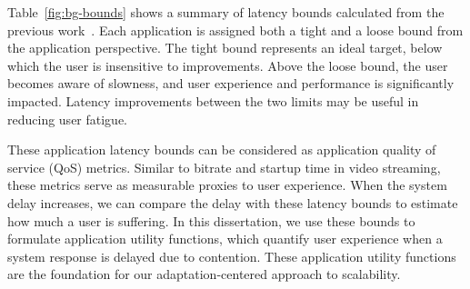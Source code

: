 Table~\ref{fig:bg-bounds} shows a summary of latency bounds calculated from the
previous work~\cite{chen2017empirical}. Each application is assigned both a
tight and a loose bound from the application perspective. The tight bound
represents an ideal target, below which the user is insensitive to improvements.
Above the loose bound, the user becomes aware of slowness, and user experience
and performance is significantly impacted. Latency improvements between the two
limits may be useful in reducing user fatigue.

These application latency bounds can be considered as application quality of
service (QoS) metrics. Similar to bitrate and startup time in video streaming,
these metrics serve as measurable proxies to user experience. When the system
delay increases, we can compare the delay with these latency bounds to estimate
how much a user is suffering. In this dissertation, we use these bounds to
formulate application utility functions, which quantify user experience when a
system response is delayed due to contention. These application utility
functions are the foundation for our adaptation-centered approach to
scalability.
